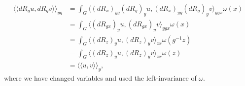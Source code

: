 \documentclass{../mathnotes}
\begin{document}
\begin{enumerate}[(a)]
        \begin{align*}
            \langle\langle dR_gu,dR_gv\rangle\rangle_{yg} &= \int_G \langle (dR_x)_{yg}(dR_g)_yu,(dR_x)_{yg}(dR_g)_yv\rangle_{ygx}\omega(x)\\
            &=\int_G\langle (dR_{gx})_yu, (dR_{gx})_yv\rangle_{ygx}\omega(x)\\
            &=\int_G\langle (dR_z)_yu, (dR_z)_yv\rangle_{zx}\omega(g^{-1}z)\\
            &=\int_G\langle (dR_z)_yu, (dR_z)_yv\rangle_{zx}\omega(z)\\
            &=\langle\langle u,v\rangle\rangle_y,
        \end{align*}
        where we have changed variables and used the left-invariance of $\omega$.
\end{enumerate}
\end{document}
